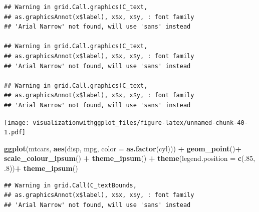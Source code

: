 \documentclass[]{krantz}
\makeatletter
\newenvironment{Shaded}{\begin{snugshade}}{\end{snugshade}}
\newcommand{\DataTypeTok}[1]{\textcolor[rgb]{0.13,0.29,0.53}{#1}}
\newcommand{\DecValTok}[1]{\textcolor[rgb]{0.00,0.00,0.81}{#1}}
\newcommand{\FloatTok}[1]{\textcolor[rgb]{0.00,0.00,0.81}{#1}}
\newcommand{\KeywordTok}[1]{\textcolor[rgb]{0.13,0.29,0.53}{\textbf{#1}}}
\newcommand{\NormalTok}[1]{#1}
\newcommand{\OperatorTok}[1]{\textcolor[rgb]{0.81,0.36,0.00}{\textbf{#1}}}
\newcommand{\StringTok}[1]{\textcolor[rgb]{0.31,0.60,0.02}{#1}}
\newenvironment{kframe}{%
\medskip{}
\setlength{\fboxsep}{.8em}
 \def\at@end@of@kframe{}%
 \ifinner\ifhmode%
  \def\at@end@of@kframe{\end{minipage}}%
  \begin{minipage}{\columnwidth}%
 \fi\fi%
 \def\FrameCommand##1{\hskip\@totalleftmargin \hskip-\fboxsep
 \colorbox{shadecolor}{##1}\hskip-\fboxsep
     \hskip-\linewidth \hskip-\@totalleftmargin \hskip\columnwidth}%
 \MakeFramed {\advance\hsize-\width
   \@totalleftmargin\z@ \linewidth\hsize
   \@setminipage}}%
 {\par\unskip\endMakeFramed%
 \at@end@of@kframe}
\renewenvironment{Shaded}{\begin{kframe}}{\end{kframe}}
\makeatother
\begin{document}
\begin{verbatim}
## Warning in grid.Call.graphics(C_text,
## as.graphicsAnnot(x$label), x$x, x$y, : font family
## 'Arial Narrow' not found, will use 'sans' instead

## Warning in grid.Call.graphics(C_text,
## as.graphicsAnnot(x$label), x$x, x$y, : font family
## 'Arial Narrow' not found, will use 'sans' instead

## Warning in grid.Call.graphics(C_text,
## as.graphicsAnnot(x$label), x$x, x$y, : font family
## 'Arial Narrow' not found, will use 'sans' instead
\end{verbatim}

\texttt{[image: visualizationwithggplot\_files/figure-latex/unnamed-chunk-40-1.pdf]}

\begin{Shaded}
\begin{Highlighting}[]
\KeywordTok{ggplot}\NormalTok{(mtcars, }\KeywordTok{aes}\NormalTok{(disp, mpg, }\DataTypeTok{color =} \KeywordTok{as.factor}\NormalTok{(cyl))) }\OperatorTok{+}\StringTok{ }\KeywordTok{geom_point}\NormalTok{()}\OperatorTok{+}\StringTok{  }\KeywordTok{scale_colour_ipsum}\NormalTok{() }\OperatorTok{+}\StringTok{ }
\KeywordTok{theme_ipsum}\NormalTok{() }\OperatorTok{+}
\KeywordTok{theme}\NormalTok{(}\DataTypeTok{legend.position =} \KeywordTok{c}\NormalTok{(.}\DecValTok{85}\NormalTok{, }\FloatTok{.8}\NormalTok{))}\OperatorTok{+}\StringTok{  }
\KeywordTok{theme_ipsum}\NormalTok{()}
\end{Highlighting}
\end{Shaded}

\begin{verbatim}
## Warning in grid.Call(C_textBounds,
## as.graphicsAnnot(x$label), x$x, x$y, : font family
## 'Arial Narrow' not found, will use 'sans' instead
\end{verbatim}
\end{document}
